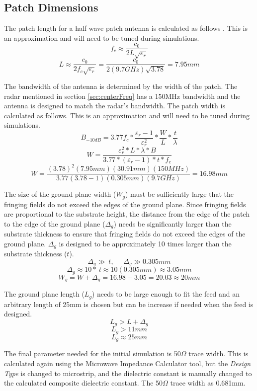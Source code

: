 \subsection{Patch Dimensions}
The patch length for a half wave patch antenna is calculated as follows \cite{patchDimensions}. This is an approximation and will need to be tuned during simulations.
    \[f_c\approx\frac{c_0}{2L\sqrt{\varepsilon_r}}\]
    \[L\approx\frac{c_0}{2f_c\sqrt{\varepsilon_r}}=\frac{c_0}{2\left(9.7GHz\right)\sqrt{3.78}}=7.95mm\]

The bandwidth of the antenna is determined by the width of the patch. The radar mentioned in section \ref{sec:centerFreq} has a 150MHz bandwidth and the antenna is designed to match the radar’s bandwidth. The patch width is calculated as follows. This is an approximation and will need to be tuned during simulations.
    \[B_{-10dB}=3.77f_c\ast\frac{\varepsilon_r-1}{\varepsilon_r^2}\ast\frac{W}{L}\ast\frac{t}{\lambda}\]
    \[W=\frac{\varepsilon_r^2\ast L\ast\lambda\ast B}{3.77\ast\left(\varepsilon_r-1\right)\ast t\ast f_c}\]
    \[W=\frac{\left(3.78\right)^2(7.95mm)(30.91mm)(150MHz)}{3.77\left(3.78-1\right)(0.305mm)(9.7GHz)}=16.98mm\]

The size of the ground plane width (\(W_g\)) must be sufficiently large that the fringing fields do not exceed the edges of the ground plane. Since fringing fields are proportional to the substrate height, the distance from the edge of the patch to the edge of the ground plane (\(\Delta _g\)) needs be significantly larger than the substrate thickness to ensure that fringing fields do not exceed the edges of the ground plane. \(\Delta _g\) is designed to be approximately 10 times larger than the substrate thickness (\(t\)).
    \[\Delta_g\gg\ t,\ \ \ \ \ \ \Delta_g\gg0.305mm\]
    \[\Delta_g\approx10\ast\ t\approx10(0.305mm)\approx3.05mm\]
    \[W_g=W+\Delta _g=16.98+3.05=20.03\approx 20mm\]

The ground plane length (\(L_g\)) needs to be large enough to fit the feed and an arbitrary length of 25mm is chosen but can be increase if needed when the feed is designed.
    \[L_g>L+\Delta_g\]
    \[L_g>11mm\]
    \[L_g\approx25mm\]

The final parameter needed for the initial simulation is 50$\Omega$ trace width. This is calculated again using the Microwave Impedance Calculator tool, but the \textit{Design Type} is changed to microstrip, and the dielectric constant is manually changed to the calculated composite dielectric constant. The 50$\Omega$ trace width as 0.681mm. 

